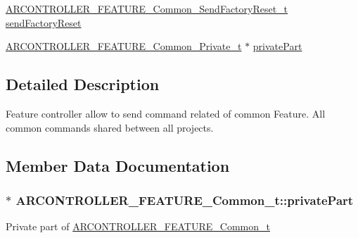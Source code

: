 \begin{DoxyCompactItemize}
\item 
\hyperlink{_a_r_c_o_n_t_r_o_l_l_e_r___feature_8h_a28e07e69f9ec02c758d734c9e69ea564}{A\+R\+C\+O\+N\+T\+R\+O\+L\+L\+E\+R\+\_\+\+F\+E\+A\+T\+U\+R\+E\+\_\+\+Common\+\_\+\+Send\+Factory\+Reset\+\_\+t} \hyperlink{struct_a_r_c_o_n_t_r_o_l_l_e_r___f_e_a_t_u_r_e___common__t_a22a1a4d3ef24ce7da8575deafd5bcb7e}{send\+Factory\+Reset}
\item 
\hyperlink{_a_r_c_o_n_t_r_o_l_l_e_r___feature_8h_a19b626b3e77c9928edb85dddf34f12c0}{A\+R\+C\+O\+N\+T\+R\+O\+L\+L\+E\+R\+\_\+\+F\+E\+A\+T\+U\+R\+E\+\_\+\+Common\+\_\+\+Private\+\_\+t} $\ast$ \hyperlink{struct_a_r_c_o_n_t_r_o_l_l_e_r___f_e_a_t_u_r_e___common__t_aea6e84e229e838bc951cd3ef1dcc135c}{private\+Part}
\end{DoxyCompactItemize}


\subsection{Detailed Description}
Feature controller allow to send command related of common Feature. All common commands shared between all projects. 

\subsection{Member Data Documentation}
\subsubsection[{\texorpdfstring{private\+Part}{privatePart}}]{$\ast$ A\+R\+C\+O\+N\+T\+R\+O\+L\+L\+E\+R\+\_\+\+F\+E\+A\+T\+U\+R\+E\+\_\+\+Common\+\_\+t\+::private\+Part}\hypertarget{struct_a_r_c_o_n_t_r_o_l_l_e_r___f_e_a_t_u_r_e___common__t_aea6e84e229e838bc951cd3ef1dcc135c}{}\label{struct_a_r_c_o_n_t_r_o_l_l_e_r___f_e_a_t_u_r_e___common__t_aea6e84e229e838bc951cd3ef1dcc135c}
Private part of \hyperlink{struct_a_r_c_o_n_t_r_o_l_l_e_r___f_e_a_t_u_r_e___common__t}{A\+R\+C\+O\+N\+T\+R\+O\+L\+L\+E\+R\+\_\+\+F\+E\+A\+T\+U\+R\+E\+\_\+\+Common\+\_\+t} 

